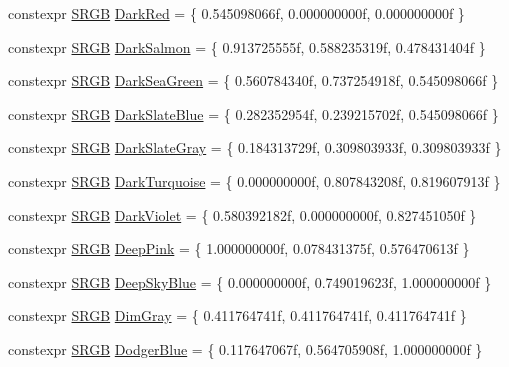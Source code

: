 \begin{DoxyCompactItemize}
\item 
constexpr \hyperlink{structmage_1_1_s_r_g_b}{S\+R\+GB} \hyperlink{namespacemage_1_1color_a680b3f5e56d358e0a6cce06b1afc6497}{Dark\+Red} = \{ 0.\+545098066f, 0.\+000000000f, 0.\+000000000f \}
\item 
constexpr \hyperlink{structmage_1_1_s_r_g_b}{S\+R\+GB} \hyperlink{namespacemage_1_1color_ade533d6b3d878604daca90eb749a7d52}{Dark\+Salmon} = \{ 0.\+913725555f, 0.\+588235319f, 0.\+478431404f \}
\item 
constexpr \hyperlink{structmage_1_1_s_r_g_b}{S\+R\+GB} \hyperlink{namespacemage_1_1color_aafa1d88a1efafbb22fb816c292546263}{Dark\+Sea\+Green} = \{ 0.\+560784340f, 0.\+737254918f, 0.\+545098066f \}
\item 
constexpr \hyperlink{structmage_1_1_s_r_g_b}{S\+R\+GB} \hyperlink{namespacemage_1_1color_a92c0b8b951c784c24337da6885e9d6ce}{Dark\+Slate\+Blue} = \{ 0.\+282352954f, 0.\+239215702f, 0.\+545098066f \}
\item 
constexpr \hyperlink{structmage_1_1_s_r_g_b}{S\+R\+GB} \hyperlink{namespacemage_1_1color_a0c8f6b007621e5583c16d43c0acf4dd4}{Dark\+Slate\+Gray} = \{ 0.\+184313729f, 0.\+309803933f, 0.\+309803933f \}
\item 
constexpr \hyperlink{structmage_1_1_s_r_g_b}{S\+R\+GB} \hyperlink{namespacemage_1_1color_ae3f6a1f72c4ba6f57385eb1d72f242a4}{Dark\+Turquoise} = \{ 0.\+000000000f, 0.\+807843208f, 0.\+819607913f \}
\item 
constexpr \hyperlink{structmage_1_1_s_r_g_b}{S\+R\+GB} \hyperlink{namespacemage_1_1color_adf42ad93a5b43879781c81938c52dc88}{Dark\+Violet} = \{ 0.\+580392182f, 0.\+000000000f, 0.\+827451050f \}
\item 
constexpr \hyperlink{structmage_1_1_s_r_g_b}{S\+R\+GB} \hyperlink{namespacemage_1_1color_a112da987930e3b2b88f936e827ab1484}{Deep\+Pink} = \{ 1.\+000000000f, 0.\+078431375f, 0.\+576470613f \}
\item 
constexpr \hyperlink{structmage_1_1_s_r_g_b}{S\+R\+GB} \hyperlink{namespacemage_1_1color_ac983ca24a416f001878b1bbdbc1dc47e}{Deep\+Sky\+Blue} = \{ 0.\+000000000f, 0.\+749019623f, 1.\+000000000f \}
\item 
constexpr \hyperlink{structmage_1_1_s_r_g_b}{S\+R\+GB} \hyperlink{namespacemage_1_1color_ab2d11540f6eb4c754eed5fc34c7e6c84}{Dim\+Gray} = \{ 0.\+411764741f, 0.\+411764741f, 0.\+411764741f \}
\item 
constexpr \hyperlink{structmage_1_1_s_r_g_b}{S\+R\+GB} \hyperlink{namespacemage_1_1color_abfa324ef1e603a69303d36526c80b3fa}{Dodger\+Blue} = \{ 0.\+117647067f, 0.\+564705908f, 1.\+000000000f \}

\end{DoxyCompactItemize}
